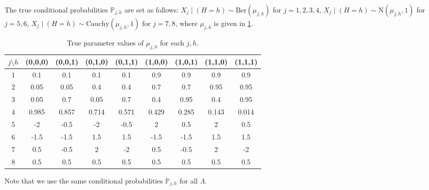 \documentclass[10pt]{article} %
\newcommand{\PP}{\mathbb P}
\begin{document}
The true conditional probabilities $\PP_{j,h}$ are set as follows: $X_j \mid (H=h) \sim \text{Ber}(\mu_{j,h})$ for $j = 1,2,3,4$, $X_j \mid (H=h) \sim \text{N}(\mu_{j,h}, 1)$ for $j = 5,6$, $X_j \mid (H=h) \sim \text{Cauchy}(\mu_{j,h}, 1)$ for $j = 7,8$, where $\mu_{j,h}$ is given in \cref{tab:pmf simulation}.
\begin{table}[h!]
\centering
\begin{tabular}{ccccccccc}
\toprule
$j \setminus h$ & (0,0,0) & (0,0,1) & (0,1,0) & (0,1,1) & (1,0,0) & (1,0,1) & (1,1,0) & (1,1,1) \\
\midrule
1 & 0.1     & 0.1     & 0.1     & 0.1     & 0.9     & 0.9     & 0.9     & 0.9     \\
2 & 0.05    & 0.05    & 0.4     & 0.4     & 0.7     & 0.7     & 0.95    & 0.95    \\
3 & 0.05    & 0.7     & 0.05    & 0.7     & 0.4     & 0.95    & 0.4     & 0.95    \\
4 & 0.985   & 0.857   & 0.714   & 0.571   & 0.429   & 0.285   & 0.143   & 0.014  \\
5 & -2 & -0.5 & -2 & -0.5 & 2 & 0.5 & 2 & 0.5 \\
6 & -1.5 & -1.5 & 1.5 & 1.5 & -1.5 & -1.5 & 1.5 & 1.5 \\
7 & 0.5 & -0.5 & 2 & -2 & 0.5 & -0.5 & 2 & -2 \\
8 & 0.5 & 0.5 & 0.5 & 0.5 & 0.5 & 0.5 & 0.5 & 0.5 \\
\bottomrule
\end{tabular}
\vspace{2mm}
\caption{True parameter values of $\mu_{j,h}$ for each $j,h$.
}
\label{tab:pmf simulation}
\end{table}
Note that we use the same conditional probabilities $\PP_{j,h}$ for all $\Lambda$. 
\end{document}
